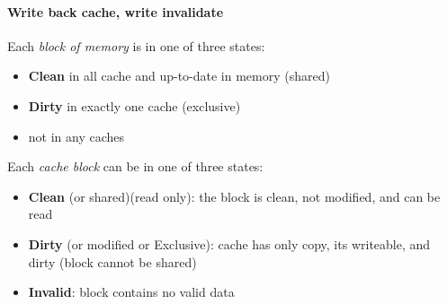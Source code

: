 \paragraph{Write back cache, write invalidate}
Each \textit{block of memory} is in one of three states:
\begin{itemize}
    \item \textbf{Clean} in all cache and up-to-date in memory (shared)
    \item \textbf{Dirty} in exactly one cache (exclusive)
    \item not in any caches
\end{itemize}
Each \textit{cache block} can be in one of three states:
\begin{itemize}
    \item \textbf{Clean} (or shared)(read only): the block is clean, not modified, and can be read
    \item \textbf{Dirty} (or modified or Exclusive): cache has only copy, its writeable, and dirty (block cannot be
    shared)
    \item \textbf{Invalid}: block contains no valid data
\end{itemize}

